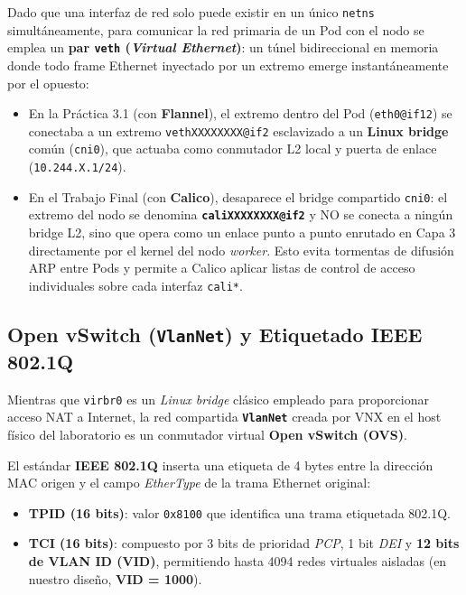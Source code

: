 Dado que una interfaz de red solo puede existir en un único \texttt{netns} simultáneamente, para comunicar la red primaria de un Pod con el nodo se emplea un \textbf{par \texttt{veth} (\textit{Virtual Ethernet})}: un túnel bidireccional en memoria donde todo frame Ethernet inyectado por un extremo emerge instantáneamente por el opuesto:
\begin{itemize}
  \item En la Práctica 3.1 (con \textbf{Flannel}), el extremo dentro del Pod (\texttt{eth0@if12}) se conectaba a un extremo \texttt{vethXXXXXXXX@if2} esclavizado a un \textbf{Linux bridge} común (\texttt{cni0}), que actuaba como conmutador L2 local y puerta de enlace (\texttt{10.244.X.1/24}).
  \item En el Trabajo Final (con \textbf{Calico}), desaparece el bridge compartido \texttt{cni0}: el extremo del nodo se denomina \textbf{\texttt{caliXXXXXXXX@if2}} y NO se conecta a ningún bridge L2, sino que opera como un enlace punto a punto enrutado en Capa 3 directamente por el kernel del nodo \textit{worker}. Esto evita tormentas de difusión ARP entre Pods y permite a Calico aplicar listas de control de acceso individuales sobre cada interfaz \texttt{cali*}.
\end{itemize}

\subsection{Open vSwitch (\texttt{VlanNet}) y Etiquetado IEEE 802.1Q}

Mientras que \texttt{virbr0} es un \textit{Linux bridge} clásico empleado para proporcionar acceso NAT a Internet, la red compartida \textbf{\texttt{VlanNet}} creada por VNX en el host físico del laboratorio es un conmutador virtual \textbf{Open vSwitch (OVS)}.

El estándar \textbf{IEEE 802.1Q} inserta una etiqueta de 4 bytes entre la dirección MAC origen y el campo \textit{EtherType} de la trama Ethernet original:
\begin{itemize}
  \item \textbf{TPID (16 bits)}: valor \texttt{0x8100} que identifica una trama etiquetada 802.1Q.
  \item \textbf{TCI (16 bits)}: compuesto por 3 bits de prioridad \textit{PCP}, 1 bit \textit{DEI} y \textbf{12 bits de VLAN ID (VID)}, permitiendo hasta 4094 redes virtuales aisladas (en nuestro diseño, \textbf{VID = 1000}).
\end{itemize}

